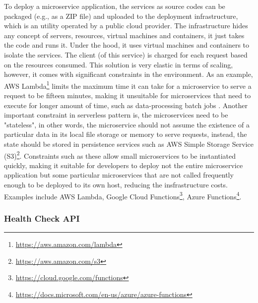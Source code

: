 \documentclass{Configuration_Files/PoliMi3i_thesis}
\begin{document}
To deploy a microservice application, the services as source codes can be packaged (e.g., as a ZIP file) and uploaded to the deployment infrastructure, which is an utility operated by a public cloud provider.
The infrastructure hides any concept of servers, resources, virtual machines and containers, it just takes the code and runs it.
Under the hood, it uses virtual machines and containers to isolate the services.
The client (of this service) is charged for each request based on the resources consumed.
This solution is very elastic in terms of scaling, however, it comes with significant constraints in the environment.
As an example, AWS Lambda\footnote{\href{https://aws.amazon.com/lambda}{https://aws.amazon.com/lambda}} limits the maximum time it can take for a microservice to serve a request to be fifteen minutes, making it unsuitable for microservices that need to execute for longer amount of time, such as data-processing batch jobs \cite{aws_lambda}.
Another important constraint in serverless pattern is, the microservices need to be "stateless", in other words, the microservice should not assume the existence of a particular data in its local file storage or memory to serve requests, instead, the state should be stored in persistence services such as AWS Simple Storage Service (S3)\footnote{\href{https://aws.amazon.com/s3/}{https://aws.amazon.com/s3}}.
Constraints such as these allow small microservices to be instantiated quickly, making it suitable for developers to deploy not the entire microservice application but some particular microservices that are not called frequently enough to be deployed to its own host, reducing the insfrastructure costs.
Examples include AWS Lambda, Google Cloud Functions\footnote{\href{https://cloud.google.com/functions}{https://cloud.google.com/functions}}, Azure Functions\footnote{\href{https://docs.microsoft.com/en-us/azure/azure-functions}{https://docs.microsoft.com/en-us/azure/azure-functions}}.

\subsubsection{Health Check API}
\label{subsubsec:health_check_api}
\end{document}

